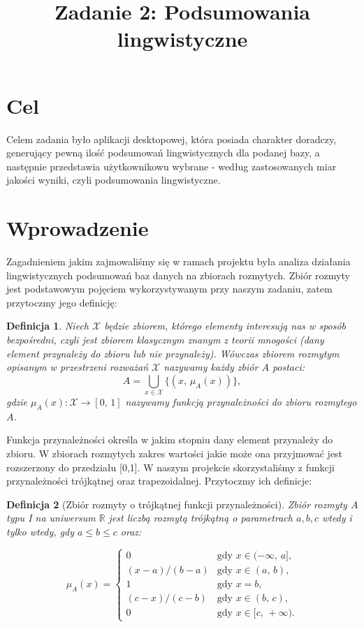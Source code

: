 \documentclass{classrep}
\author{
\studentinfo{Justyna Hubert}{210200} \and
\studentinfo{Karol Podlewski}{210294}
}
\title{Zadanie 2: Podsumowania lingwistyczne}
\newtheorem{definition}{Definicja}
\begin{document}
\maketitle

\section{Cel}
Celem zadania było aplikacji desktopowej, która posiada charakter doradczy, generujący pewną ilość podsumowań lingwistycznych dla podanej bazy, a następnie przedstawia użytkownikowu wybrane - według zastosowanych miar jakości wyniki, czyli podsumowania lingwistyczne.

\section{Wprowadzenie}	
Zagadnieniem jakim zajmowaliśmy się w ramach projektu była analiza działania lingwistycznych podsumowań baz danych na zbiorach rozmytych. Zbiór rozmyty jest podstawowym pojęciem wykorzystywanym przy naszym zadaniu, zatem przytoczmy jego definicję:

\begin{definition}
Niech \(\mathcal{X}\) będzie zbiorem, którego elementy interesują
nas w sposób bezpośredni, czyli jest zbiorem klasycznym znanym z teorii mnogości (dany element przynależy do zbioru lub nie przynależy).
Wówczas \emph{zbiorem rozmytym opisanym w przestrzeni rozważań \(\mathcal{X}\)}
nazywamy każdy zbiór \(A\) postaci:
\[A = \bigcup_{x \in \mathcal{X}} \{(x,\, \mu_A(x))\},\]
gdzie \(\mu_A(x) : \mathcal{X} \to [0,\,1]\) nazywamy \emph{funkcją
przynależności do zbioru rozmytego \(A\)}.
\end{definition}

Funkcja przynależności określa w jakim stopniu dany element przynależy do zbioru. W zbiorach rozmytych zakres wartości jakie może ona przyjmować jest rozszerzony do przedziału [0,1].
W naszym projekcie skorzystaliśmy z funkcji przynależności trójkątnej oraz trapezoidalnej. Przytoczmy ich definicje:

\begin{definition}[Zbiór rozmyty o trójkątnej funkcji przynależności]
Zbiór rozmyty \(A\) typu I na uniwersum \(\mathbb{R}\) jest
\emph{liczbą rozmytą trójkątną o parametrach \(a, b, c\)} wtedy i tylko
wtedy, gdy \(a \leq b \leq c\) oraz:

\[\mu_A(x) = \begin{cases}
0                 & \mbox{gdy } x \in (-\infty,\, a], \\
(x - a) / (b - a) & \mbox{gdy } x \in (a,\, b), \\
1                 & \mbox{gdy } x = b, \\
(c - x) / (c - b) & \mbox{gdy } x \in (b,\, c), \\
0                 & \mbox{gdy } x \in [c,\, +\infty).
\end{cases}\]
\end{definition}
\end{document}
